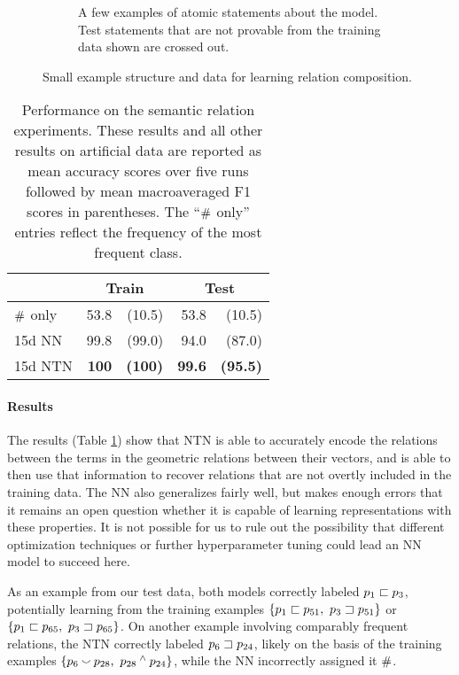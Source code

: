 \begin{figure}[t]
\begin{subfigure}[t]{0.43\textwidth}
\begin{tabular}[b]{c  c}
      \bottomrule
    \end{tabular}

    \caption{A few examples of atomic statements about the
      model.  Test statements that are not provable from the training data shown are
      crossed out.}
  \end{subfigure}  
  \caption{Small example structure and data for learning relation composition.}
  \label{lattice-figure}
\end{figure} 

\begin{table}[tp]
  \centering\small
  \begin{tabular}{ l r@{ \ }r r@{ \ }r }
    \toprule
    ~&\multicolumn{2}{c}{Train} & \multicolumn{2}{c}{Test}\\
    \midrule
    $\mathbin{\#}$ only &53.8 &(10.5)    &53.8 &(10.5) \\
    15d NN &				99.8&	(99.0) &94.0&(87.0) \\
    15d NTN 				& \textbf{100} & \textbf{(100)} & \textbf{99.6} & \textbf{(95.5)}\\
    \bottomrule
  \end{tabular}
  
  
  \caption{Performance on the semantic relation experiments. These results and all other results on artificial data are reported as mean accuracy scores over five runs followed by mean macroaveraged F1 scores in parentheses. The ``$\mathbin{\#}$ only'' entries reflect the frequency of the most frequent class.}
  \label{joinresultstable}
\end{table}

\paragraph{Results} 
The results (Table \ref{joinresultstable}) show that NTN is able to accurately encode the relations between the terms in the geometric relations between their vectors, 
and is able to then use that information to recover relations that 
are not overtly included in the training data. The NN also generalizes fairly well, 
but makes enough errors that it remains an open question whether 
it is capable of learning representations with these properties. 
It is not possible for us to rule out the possibility that different optimization techniques or
further hyperparameter tuning could lead an NN model to succeed here.

As an example from our test data, both models correctly labeled $p_1 \sqsubset p_3$, potentially learning from the training examples $\{p_1 \sqsubset p_{51},~p_3 \sqsupset p_{51}\}$ or $\{p_1\sqsubset p_{65},~p_3 \sqsupset p_{65} \}$. On another example involving comparably frequent relations, the NTN correctly labeled $p_6 \sqsupset p_{24}$, likely on the basis of the training examples $\{p_6 \mathbin{\smallsmile} p_{28},~p_{28} \mathbin{^{\wedge}} p_{24}\}$, while the NN incorrectly assigned it $\mathbin{\#}$.

